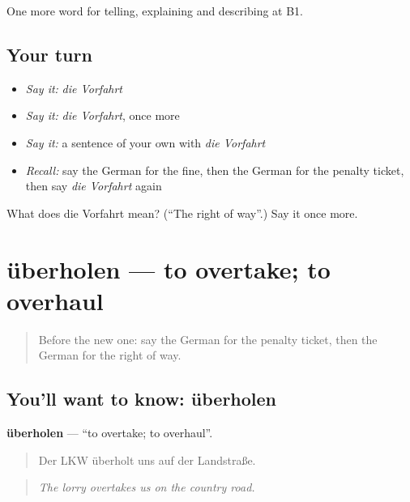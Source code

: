 \begin{grammarlens}[title={What you've built}]
One more word for telling, explaining and describing at B1.
\end{grammarlens}

\subsection*{Your turn}
\begin{itemize}
\raggedright
  \item \emph{Say it:} \emph{die Vorfahrt}
  \item \emph{Say it:} \emph{die Vorfahrt}, once more
  \item \emph{Say it:} a sentence of your own with \emph{die Vorfahrt}
  \item \emph{Recall:} say the German for the fine, then the German for the penalty ticket, then say \emph{die Vorfahrt} again
\end{itemize}

\begin{tcolorbox}[breakable,colback=teal!4,colframe=teal!35!black,title={Before you move on}]
What does die Vorfahrt mean? (\textquotedblleft{}The right of way\textquotedblright{}.) Say it once more.
\end{tcolorbox}
\section[überholen]{überholen — to overtake; to overhaul}

\label{lesson:GE-C408-ueberholen}



\begin{quote}
Before the new one: say the German for the penalty ticket, then the German for the right of way.
\end{quote}

\subsection*{You'll want to know: überholen}
\textbf{überholen} — \textquotedblleft{}to overtake; to overhaul\textquotedblright{}.

\begin{quote}
Der LKW überholt uns auf der Landstraße.
\end{quote}

\begin{quote}
\emph{The lorry overtakes us on the country road.}
\end{quote}

